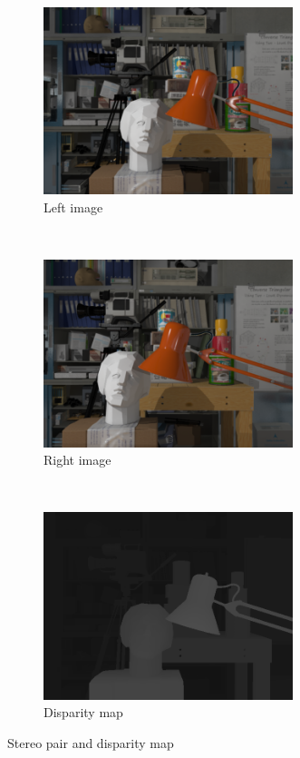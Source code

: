 \begin{figure}[h!]
\centering
\begin{subfigure}[]{0.4\textwidth}
\centering
\includegraphics[width=0.8\textwidth]{./img/left.png}
\caption{\scriptsize{Left image}}
\end{subfigure}%
~ %
\begin{subfigure}[]{0.4\textwidth}
\centering
\includegraphics[width=0.8\textwidth]{./img/right.png}
\caption{\scriptsize{Right image}}
\end{subfigure} 
~\quad
\begin{subfigure}[]{0.4\textwidth}
\centering
\includegraphics[width=0.8\textwidth]{./img/disparity.png}
\caption{\scriptsize{Disparity map}}
\label{fig:disparity}
\end{subfigure}%
\caption{\small{Stereo pair and disparity map}}
\end{figure}
